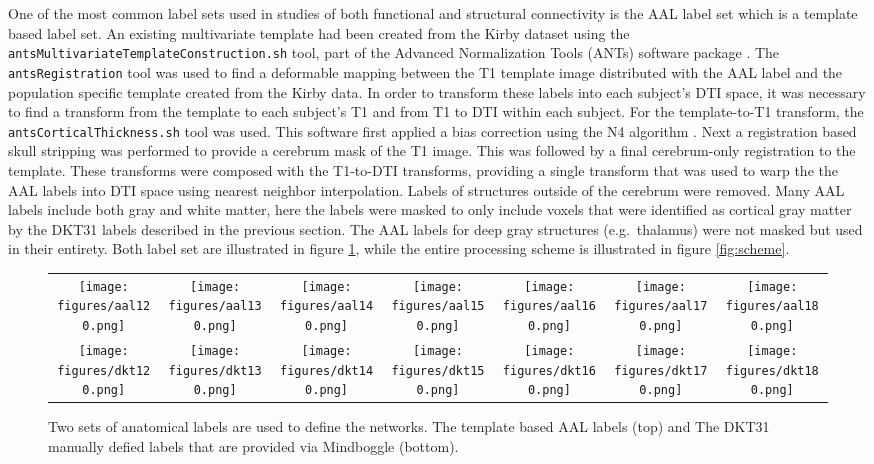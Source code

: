 \documentclass{frontiersSCNS} %
\begin{document}
One of the most common label sets used in studies of both functional and structural
connectivity is the AAL label set \citep{Tzourio-Mazoyer2002} which is a template based label set. An existing multivariate template had 
been created from the Kirby dataset using the \texttt{antsMultivariateTemplateConstruction.sh} tool, part of the 
Advanced Normalization Tools (ANTs) software package \citep{ANTS}. The \texttt{antsRegistration} tool was used to find
a deformable mapping between the T1 template image distributed with the AAL label and the population specific template
created from the Kirby data.  In order to transform these labels into each 
subject's DTI space, it was necessary to find a transform from the template to each subject's T1 and from T1 to DTI within 
each subject. For the template-to-T1 transform, the \texttt{antsCorticalThickness.sh} tool was used. This software first applied a bias
correction using the N4 algorithm \citep{Tustison2010}. Next a registration based skull stripping was performed to provide
a cerebrum mask of the T1 image. This was followed by a final cerebrum-only registration to the template. These transforms were
composed with the T1-to-DTI transforms, providing a single transform that was used to warp the the AAL labels into DTI space using nearest neighbor interpolation. Labels of structures outside of the cerebrum were removed.
Many AAL labels include both gray and white matter, here the labels were masked to only include voxels 
that were identified as cortical gray matter by the DKT31 labels described in the previous section. 
The AAL labels for deep gray structures (e.g.\ thalamus) were not masked but used in their entirety. Both label set are illustrated
in figure \ref{fig:labels}, while the entire processing scheme is illustrated in figure \ref{fig:scheme}.

\begin{figure}
\begin{center}
\renewcommand{\tabcolsep}{0pt}
\renewcommand\arraystretch{0}
\begin{tabular}{ccccccc}
\texttt{[image: figures/aal120.png]} & 
\texttt{[image: figures/aal130.png]} & 
\texttt{[image: figures/aal140.png]} & 
\texttt{[image: figures/aal150.png]} & 
\texttt{[image: figures/aal160.png]} & 
\texttt{[image: figures/aal170.png]} & 
\texttt{[image: figures/aal180.png]} \\
\texttt{[image: figures/dkt120.png]} & 
\texttt{[image: figures/dkt130.png]} & 
\texttt{[image: figures/dkt140.png]} & 
\texttt{[image: figures/dkt150.png]} & 
\texttt{[image: figures/dkt160.png]} & 
\texttt{[image: figures/dkt170.png]} & 
\texttt{[image: figures/dkt180.png]}
\end{tabular}
\caption{Two sets of anatomical labels are used to define the networks. The template based AAL labels (top) and The DKT31 manually defied labels that are provided via Mindboggle (bottom). }
\label{fig:labels}
\end{center}
\end{figure}
\end{document}
